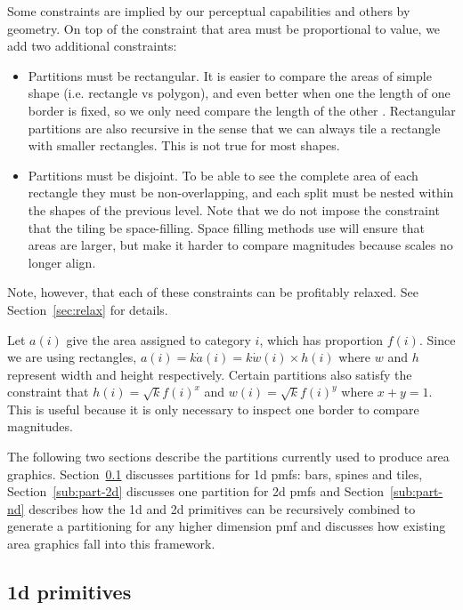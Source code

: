 \documentclass[letterpaper,oneside]{scrartcl}
\begin{document}
Some constraints are implied by our perceptual capabilities and others by geometry. On top of the constraint that area must be proportional to value, we add two additional constraints:

\begin{itemize}

  \item Partitions must be rectangular. It is easier to compare the areas of simple shape (i.e. rectangle vs polygon), and even better when one the length of one border is fixed, so we only need compare the length of the other \citep{cleveland:1984}. Rectangular partitions are also recursive in the sense that we can always tile a rectangle with smaller rectangles. This is not true for most shapes.

  \item Partitions must be disjoint. To be able to see the complete area of each rectangle they must be non-overlapping, and each split must be nested within the shapes of the previous level. Note that we do not impose the constraint that the tiling be space-filling. Space filling methods use will ensure that areas are larger, but make it harder to compare magnitudes because scales no longer align.

\end{itemize}

Note, however, that each of these constraints can be profitably relaxed. See Section~\ref{sec:relax} for details.

Let $a(i)$ give the area assigned to category $i$, which has proportion $f(i)$. Since we are using rectangles, $a(i) = k \dot a(i) = k \dot w(i) \times h(i)$ where $w$ and $h$ represent width and height respectively. Certain partitions also satisfy the constraint that $h(i) = \sqrt{k} f(i)^x$ and $w(i) = \sqrt{k} f(i)^y$ where $x + y = 1$. This is useful because it is only necessary to inspect one border to compare magnitudes.

The following two sections describe the partitions currently used to produce area graphics. Section~\ref{sub:part-1d} discusses partitions for 1d pmfs: bars, spines and tiles, Section~\ref{sub:part-2d} discusses one partition for 2d pmfs and Section~\ref{sub:part-nd} describes how the 1d and 2d primitives can be recursively combined to generate a partitioning for any higher dimension pmf and discusses how existing area graphics fall into this framework.

\subsection{1d primitives}
\label{sub:part-1d}
\end{document}
